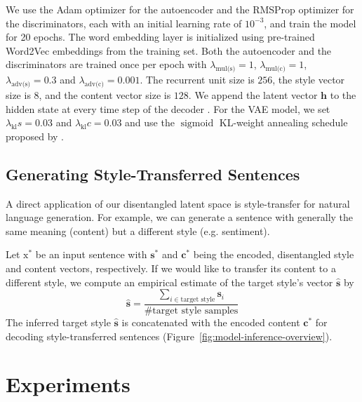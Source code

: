 \documentclass[letterpaper]{article} %
\newcommand{\rmx}{\mathrm x}
\newcommand{\hyp}[1]{\lambda_{\text{#1}}}
\newcommand{\citeay}[1]{\citeauthor{#1} \shortcite{#1}}
\begin{document}
We use the Adam optimizer \cite{kingma2014adam} for the autoencoder and the RMSProp optimizer \cite{tieleman2012lecture} for the discriminators, each with an initial learning rate of $10^{-3}$, and train the model for 20 epochs.
The word embedding layer is initialized using pre-trained Word2Vec embeddings \cite{mikolov2013distributed} from the training set.
Both the autoencoder and the discriminators are trained once per epoch with $\hyp{mul(s)} = 1$, $\hyp{mul(c)} = 1$, $\hyp{adv(s)} = 0.3$ and $\hyp{adv(c)} = 0.001$.
The recurrent unit size is $256$, the style vector size is $8$, and the content vector size is $128$.
We append the latent vector $\bm h$ to the hidden state at every time step of the decoder \cite{bahuleyan2017variational}.
For the VAE model, we set $\hyp{kl}{s} = 0.03$ and $\hyp{kl}{c} = 0.03$ and use the $\operatorname{sigmoid}$ KL-weight annealing schedule proposed by \citeay{bahuleyan2018probabilistic}.


\subsection{Generating Style-Transferred Sentences} \label{ssec:sentence-generation}

A direct application of our disentangled latent space is style-transfer for natural language generation.
For example, we can generate a sentence with generally the same meaning (content) but a different style (e.g. sentiment).

Let $\rmx^*$ be an input sentence with $\bm s^*$ and $\bm c^*$ being the encoded, disentangled style and content vectors, respectively.
If we would like to transfer its content to a different style, we compute an empirical estimate of the target style's vector $\hat{\bm s}$ by
\begin{equation*}
	\hat{\bm s}=\frac{\sum_{i\in\text{target style}}\bm s_i}{\text{\# target style samples}}
\end{equation*}
The inferred target style $\hat{\bm s}$ is concatenated with the encoded content $\bm c^*$ for decoding style-transferred sentences (Figure~\ref{fig:model-inference-overview}).


\section{Experiments}
\end{document}
